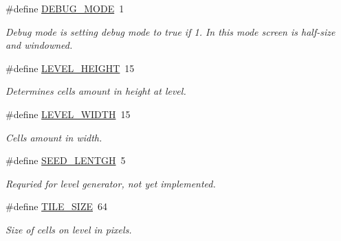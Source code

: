 \begin{DoxyCompactItemize}
\item 
\#define \hyperlink{group___library_merger_gac80a3592e72fd96b772ee47a7d8e0d0a}{D\+E\+B\+U\+G\+\_\+\+M\+O\+DE}~1
\begin{DoxyCompactList}\small\item\em Debug mode is setting debug mode to true if 1. In this mode screen is half-\/size and windowned. \end{DoxyCompactList}\item 
\mbox{\label{group___library_merger_ga16621561d55e77faa59fbfdae692916f}} 
\#define \hyperlink{group___library_merger_ga16621561d55e77faa59fbfdae692916f}{L\+E\+V\+E\+L\+\_\+\+H\+E\+I\+G\+HT}~15
\begin{DoxyCompactList}\small\item\em Determines cells amount in height at level. \end{DoxyCompactList}\item 
\mbox{\label{group___library_merger_ga219cc98394ab36a78470c0627c4f8464}} 
\#define \hyperlink{group___library_merger_ga219cc98394ab36a78470c0627c4f8464}{L\+E\+V\+E\+L\+\_\+\+W\+I\+D\+TH}~15
\begin{DoxyCompactList}\small\item\em Cells amount in width. \end{DoxyCompactList}\item 
\mbox{\label{group___library_merger_ga9c1e5774cebc49f1e8f2e12d7ead3964}} 
\#define \hyperlink{group___library_merger_ga9c1e5774cebc49f1e8f2e12d7ead3964}{S\+E\+E\+D\+\_\+\+L\+E\+N\+T\+GH}~5
\begin{DoxyCompactList}\small\item\em Requried for level generator, not yet implemented. \end{DoxyCompactList}\item 
\mbox{\label{group___library_merger_ga62ecd70800687eb2d625af180c4210d7}} 
\#define \hyperlink{group___library_merger_ga62ecd70800687eb2d625af180c4210d7}{T\+I\+L\+E\+\_\+\+S\+I\+ZE}~64
\begin{DoxyCompactList}\small\item\em Size of cells on level in pixels. \end{DoxyCompactList}\item 

\end{DoxyCompactItemize}
